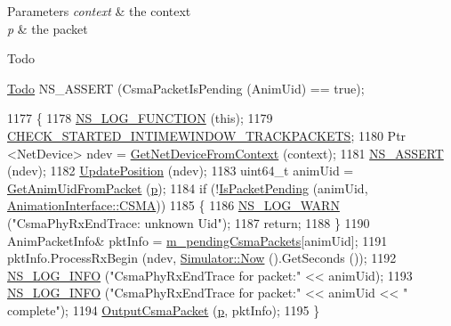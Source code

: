 \begin{DoxyParams}{Parameters}
{\em context} & the context \\
\hline
{\em p} & the packet \\
\hline
\end{DoxyParams}
\begin{DoxyRefDesc}{Todo}
\item[\hyperlink{todo__todo000143}{Todo}]N\+S\+\_\+\+A\+S\+S\+E\+RT (Csma\+Packet\+Is\+Pending (Anim\+Uid) == true); \end{DoxyRefDesc}

\begin{DoxyCode}
1177 \{
1178   \hyperlink{log-macros-disabled_8h_a90b90d5bad1f39cb1b64923ea94c0761}{NS\_LOG\_FUNCTION} (\textcolor{keyword}{this});
1179   \hyperlink{animation-interface_8h_acdf351a3155a6ccf1813189e10dba8f5}{CHECK\_STARTED\_INTIMEWINDOW\_TRACKPACKETS};
1180   Ptr <NetDevice> ndev = \hyperlink{classns3_1_1AnimationInterface_a5054e94f0c5e3d0a4443cfbe52e2ea30}{GetNetDeviceFromContext} (context);
1181   \hyperlink{assert_8h_a6dccdb0de9b252f60088ce281c49d052}{NS\_ASSERT} (ndev);
1182   \hyperlink{classns3_1_1AnimationInterface_ab751cf6f459289f0978f4bb97b93044d}{UpdatePosition} (ndev);
1183   uint64\_t animUid = \hyperlink{classns3_1_1AnimationInterface_a18e6a184ccd7dee800bf734f8adc818c}{GetAnimUidFromPacket} (\hyperlink{lte__link__budget_8m_ac9de518908a968428863f829398a4e62}{p});
1184   \textcolor{keywordflow}{if} (!\hyperlink{classns3_1_1AnimationInterface_a0bee27aa30e136d5035050ec2ef0012d}{IsPacketPending} (animUid, \hyperlink{classns3_1_1AnimationInterface_a801a4efd553ff0d1d768cd70d22456b6a5fb0f9f61327638f165213b90492cfa7}{AnimationInterface::CSMA}))
1185     \{
1186       \hyperlink{group__logging_gade7208b4009cdf0e25783cd26766f559}{NS\_LOG\_WARN} (\textcolor{stringliteral}{"CsmaPhyRxEndTrace: unknown Uid"}); 
1187       \textcolor{keywordflow}{return};
1188     \}
1190   AnimPacketInfo& pktInfo = \hyperlink{classns3_1_1AnimationInterface_ae80a577d450396d34df2499ec2c3c6ec}{m\_pendingCsmaPackets}[animUid];
1191   pktInfo.ProcessRxBegin (ndev, \hyperlink{classns3_1_1Simulator_ac3178fa975b419f7875e7105be122800}{Simulator::Now} ().GetSeconds ());
1192   \hyperlink{group__logging_gafbd73ee2cf9f26b319f49086d8e860fb}{NS\_LOG\_INFO} (\textcolor{stringliteral}{"CsmaPhyRxEndTrace for packet:"} << animUid);
1193   \hyperlink{group__logging_gafbd73ee2cf9f26b319f49086d8e860fb}{NS\_LOG\_INFO} (\textcolor{stringliteral}{"CsmaPhyRxEndTrace for packet:"} << animUid << \textcolor{stringliteral}{" complete"});
1194   \hyperlink{classns3_1_1AnimationInterface_a17b147520da418eaf7b892624589f160}{OutputCsmaPacket} (\hyperlink{lte__link__budget_8m_ac9de518908a968428863f829398a4e62}{p}, pktInfo);
1195 \}
\end{DoxyCode}


